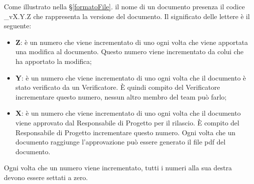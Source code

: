 		    \label{codici}

			    Come illustrato nella \S\ref{formatoFile}. il nome di
                un documento presenza il codice \_vX.Y.Z che rappresenta la versione del documento.
                Il significato delle lettere è il seguente:

                    \begin{itemize}
                        \item \textbf{Z}: è un numero che viene incrementato di uno ogni volta che viene
                        apportata una modifica al documento. Questo numero viene incrementato da colui che
                        ha apportato la modifica;
                        \item \textbf{Y}: è un numero che viene incrementato di uno ogni volta che il documento
                        è stato verificato da un Verificatore. È quindi compito del Verificatore incrementare
                        questo numero, nessun altro membro del team può farlo;
                        \item \textbf{X}: è un numero che viene incrementato di uno ogni volta che il documento
                        viene approvato dal Responsabile di Progetto per il rilascio. È compito del Responsabile di Progetto
                        incrementare questo numero. Ogni volta che un documento raggiunge l'approvazione può
                        essere generato il file pdf del documento.
                    \end{itemize}

                Ogni volta che un numero viene incrementato, tutti i numeri alla sua destra devono essere settati a zero.
